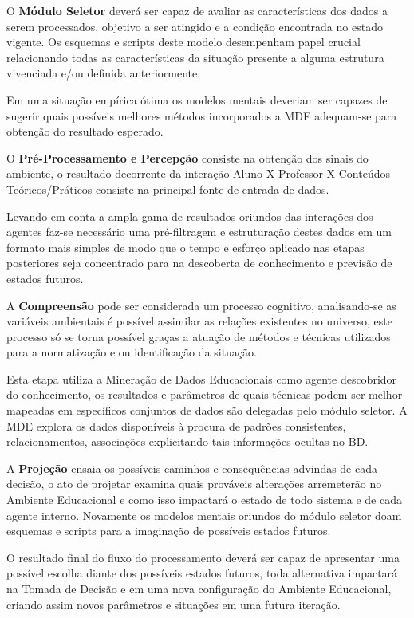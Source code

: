 \documentclass[12pt]{article}
\begin{document}
O \textbf{Módulo Seletor} deverá ser capaz de avaliar as características dos dados a serem processados, objetivo a ser atingido e a condição encontrada no estado vigente. Os esquemas e scripts deste modelo desempenham papel crucial relacionando todas as características da situação presente a alguma estrutura vivenciada e/ou definida anteriormente. 

Em uma situação empírica ótima os modelos mentais deveriam ser capazes de sugerir quais possíveis melhores métodos incorporados a MDE adequam-se para obtenção do resultado esperado.  

O \textbf{Pré-Processamento e Percepção} consiste na obtenção dos sinais do ambiente, o resultado decorrente da interação Aluno X Professor X Conteúdos Teóricos/Práticos consiste na principal fonte de entrada de dados. 

Levando em conta a ampla gama de resultados oriundos das interações dos agentes faz-se necessário uma pré-filtragem e estruturação destes dados em um formato mais simples de modo que o tempo e esforço aplicado nas etapas posteriores seja concentrado para na descoberta de conhecimento e previsão de estados futuros. 

A \textbf{Compreensão} pode ser considerada um processo cognitivo, analisando-se as variáveis ambientais é possível assimilar as relações existentes no universo, este processo só se torna possível graças a atuação de métodos e técnicas utilizados para a normatização e ou identificação da situação.

Esta etapa utiliza a Mineração de Dados Educacionais como agente descobridor do conhecimento, os resultados e parâmetros de quais técnicas podem ser melhor mapeadas em específicos conjuntos de dados são delegadas pelo módulo seletor. A MDE explora os dados disponíveis à procura de padrões consistentes, relacionamentos, associações explicitando tais informações ocultas no BD.

A \textbf{Projeção} ensaia os possíveis caminhos e consequências advindas de cada decisão, o ato de projetar examina quais prováveis alterações arremeterão no Ambiente Educacional e como isso impactará o estado de todo sistema e de cada agente interno. Novamente os modelos mentais oriundos do módulo seletor doam esquemas e scripts para a imaginação de possíveis estados futuros.

O resultado final do fluxo do processamento deverá ser capaz de apresentar uma possível escolha diante dos possíveis estados futuros, toda alternativa impactará na Tomada de Decisão e em uma nova configuração do Ambiente Educacional, criando assim novos parâmetros e situações em uma futura iteração.
\end{document}
